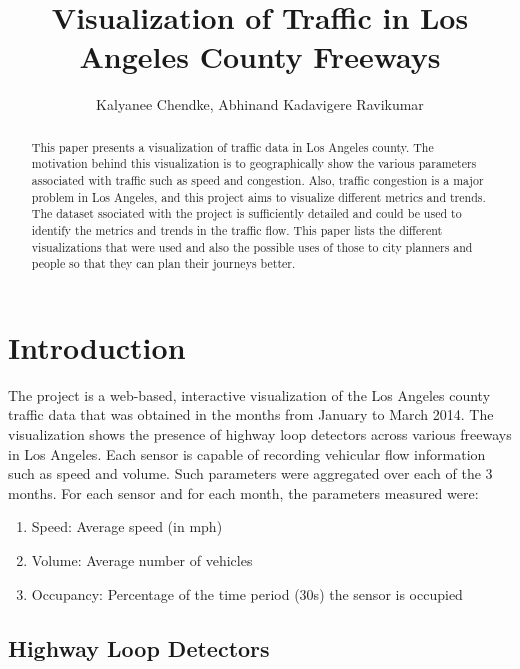 \documentclass{llncs}
\begin{document}
\title{Visualization of Traffic in Los Angeles County Freeways}

\author{Kalyanee Chendke, Abhinand Kadavigere Ravikumar}

\maketitle

\begin{abstract}

This paper presents a visualization of traffic data in Los Angeles county. The motivation behind this visualization is to geographically show the various parameters associated with traffic such as speed and congestion. Also, traffic congestion is a major problem in Los Angeles, and this project aims to visualize different metrics and trends. The dataset ssociated with the project is sufficiently detailed and could be used to identify the metrics and trends in the traffic flow. This paper lists the different visualizations that were used and also the possible uses of those to city planners and people so that they can plan their journeys better. 

\end{abstract}

\section{Introduction}\label{sec:Introduction}

The project is a web-based, interactive visualization of the Los Angeles county traffic data that was obtained in the months from January to March 2014. The visualization shows the presence of highway loop detectors across various freeways in Los Angeles. Each sensor is capable of recording vehicular flow information such as speed and volume. Such parameters were aggregated over each of the 3 months. For each sensor and for each month, the parameters measured were:
\begin{enumerate}
\item Speed: Average speed (in mph)
\item Volume: Average number of vehicles
\item Occupancy: Percentage of the time period (30s) the sensor is occupied 
\end{enumerate}

\subsection{Highway Loop Detectors}\label{sec:Highway Loop Detectors}
\end{document}
